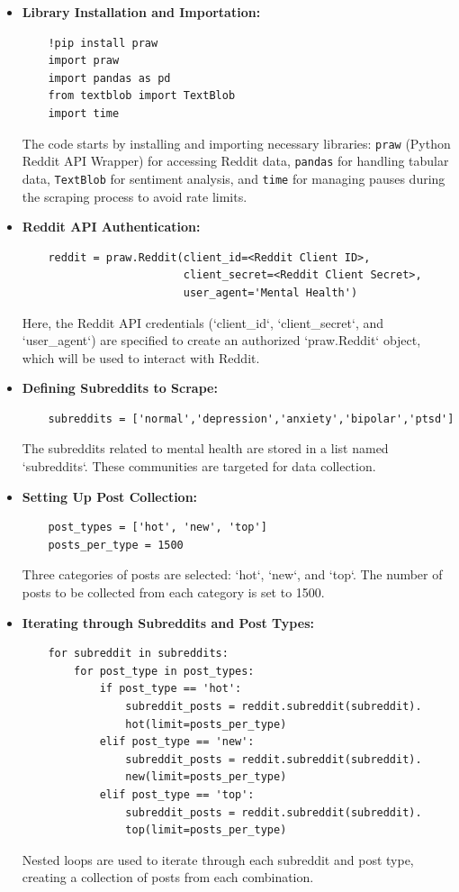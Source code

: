 \begin{itemize}
    \item \textbf{Library Installation and Importation:}
    \begin{verbatim}
    !pip install praw
    import praw
    import pandas as pd
    from textblob import TextBlob
    import time
    \end{verbatim}
    \noindent
    The code starts by installing and importing necessary libraries: 
    \texttt{praw} (Python Reddit API Wrapper) for accessing Reddit data, 
    \texttt{pandas} for handling tabular data, 
    \texttt{TextBlob} for sentiment analysis, 
    and \texttt{time} for managing pauses during the scraping process to avoid rate limits.

    \item \textbf{Reddit API Authentication:}
    \begin{verbatim}
    reddit = praw.Reddit(client_id=<Reddit Client ID>,
                         client_secret=<Reddit Client Secret>,
                         user_agent='Mental Health')
    \end{verbatim}
    \noindent
    Here, the Reddit API credentials (`client\_id`, `client\_secret`, and `user\_agent`) are specified to create an authorized `praw.Reddit` object, which will be used to interact with Reddit.

    \item \textbf{Defining Subreddits to Scrape:}
    \begin{verbatim}
    subreddits = ['normal','depression','anxiety','bipolar','ptsd']
    \end{verbatim}
    \noindent
    The subreddits related to mental health are stored in a list named `subreddits`. These communities are targeted for data collection.

    \item \textbf{Setting Up Post Collection:}
    \begin{verbatim}
    post_types = ['hot', 'new', 'top']
    posts_per_type = 1500
    \end{verbatim}
    \noindent
    Three categories of posts are selected: `hot`, `new`, and `top`. The number of posts to be collected from each category is set to 1500.

    \item \textbf{Iterating through Subreddits and Post Types:}
    \begin{verbatim}
    for subreddit in subreddits:
        for post_type in post_types:
            if post_type == 'hot':
                subreddit_posts = reddit.subreddit(subreddit).
                hot(limit=posts_per_type)
            elif post_type == 'new':
                subreddit_posts = reddit.subreddit(subreddit).
                new(limit=posts_per_type)
            elif post_type == 'top':
                subreddit_posts = reddit.subreddit(subreddit).
                top(limit=posts_per_type)
    \end{verbatim}
    \noindent
    Nested loops are used to iterate through each subreddit and post type, creating a collection of posts from each combination.


\end{itemize}

